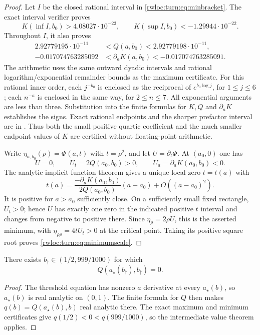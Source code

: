 \begin{proof}
Let $I$ be the closed rational interval in
\eqref{rwloc:turn:eq:minbracket}. The exact interval verifier
 proves
\[
 K(\inf I,b_0)>4.08027\cdot10^{-23},\qquad
 K(\sup I,b_0)<-1.29944\cdot10^{-22}.
\]
Throughout $I$, it also proves
\begin{align*}
 2.92779195\cdot10^{-11}
     &<Q(a,b_0)<2.92779198\cdot10^{-11},\\
 -0.017074763285092
     &<\partial_a K(a,b_0)<-0.017074763285091.
\end{align*}
The arithmetic uses the same outward dyadic intervals and rational
logarithm/exponential remainder bounds as the maximum certificate.
For this rational inner order, each $j^{-b_0}$ is enclosed as the
reciprocal of $e^{b_0\log j}$, for $1\leq j\leq6$; each
$n^{-a}$ is enclosed in the same way, for $2\leq n\leq7$.
All exponential arguments are less than three. Substitution into
the finite formulas for $K,Q$ and $\partial_aK$ establishes the
signs. Exact rational endpoints and the sharper prefactor interval
are in . Thus both the
small positive quartic coefficient and the much smaller endpoint
values of $K$ are certified without floating-point arithmetic.

Write $\eta_{a,b_0}(\rho)=\Phi(a,t)$ with $t=\rho^2$, and
let $U=\partial_t\Phi$. At $(a_0,0)$ one has
\[
 U=0,\qquad U_t=2Q(a_0,b_0)>0,\qquad
 U_a=\partial_aK(a_0,b_0)<0.
\]
The analytic implicit-function theorem gives a unique local zero
$t=t(a)$ with
\[
 t(a)=\frac{-\partial_aK(a_0,b_0)}{2Q(a_0,b_0)}
                (a-a_0)+O((a-a_0)^2).
\]
It is positive for $a>a_0$ sufficiently close. On a sufficiently
small fixed rectangle, $U_t>0$; hence $U$ has exactly one zero in
the indicated positive $t$ interval and changes from negative to
positive there. Since $\eta_\rho=2\rho U$, this is the asserted
minimum, with $\eta_{\rho\rho}=4tU_t>0$ at the critical point.
Taking its positive square root proves
\eqref{rwloc:turn:eq:minimumscale}.
\end{proof}

\begin{corollary}
\label{rwloc:turn:cor:quarticzero}
There exists $b_\dagger\in(1/2,999/1000)$ for which
\[
 Q(a_\star(b_\dagger),b_\dagger)=0.
\]
\end{corollary}

\begin{proof}
The threshold equation has nonzero $a$ derivative at every
$a_\star(b)$, so $a_\star(b)$ is real analytic on $(0,1)$.
The finite formula for $Q$ then makes
$q(b)=Q(a_\star(b),b)$ real analytic there. The exact maximum and
minimum certificates give $q(1/2)<0<q(999/1000)$, so the
intermediate value theorem applies.
\end{proof}

